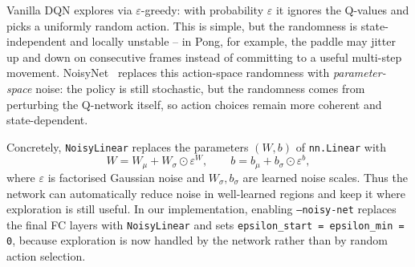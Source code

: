 \documentclass[10pt,twocolumn,letterpaper]{article}
\begin{document}
Vanilla DQN explores via $\varepsilon$-greedy: with probability $\varepsilon$ it ignores the Q-values and picks a uniformly random action. This is simple, but the randomness is state-independent and locally unstable -- in Pong, for example, the paddle may jitter up and down on consecutive frames instead of committing to a useful multi-step movement. NoisyNet~\cite{fortunato2018noisy} replaces this action-space randomness with \emph{parameter-space} noise: the policy is still stochastic, but the randomness comes from perturbing the Q-network itself, so action choices remain more coherent and state-dependent.

Concretely, \texttt{NoisyLinear} replaces the parameters $(W, b)$ of \texttt{nn.Linear} with
\[
    W = W_\mu + W_\sigma \odot \varepsilon^W, \qquad b = b_\mu + b_\sigma \odot \varepsilon^b,
\]
where $\varepsilon$ is factorised Gaussian noise and $W_\sigma, b_\sigma$ are learned noise scales. Thus the network can automatically reduce noise in well-learned regions and keep it where exploration is still useful. In our implementation, enabling \texttt{--noisy-net} replaces the final FC layers with \texttt{NoisyLinear} and sets \texttt{epsilon\_start = epsilon\_min = 0}, because exploration is now handled by the network rather than by random action selection.
\end{document}
